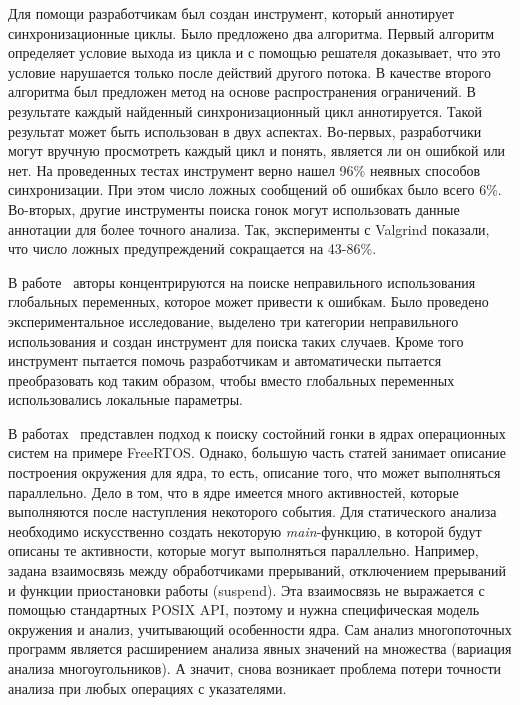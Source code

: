 Для помощи разработчикам был создан инструмент, который аннотирует синхронизационные циклы.
Было предложено два алгоритма.
Первый алгоритм определяет условие выхода из цикла и с помощью решателя доказывает, что это условие нарушается только после действий другого потока.
В качестве второго алгоритма был предложен метод на основе распространения ограничений.
В результате каждый найденный синхронизационный цикл аннотируется. Такой результат может быть использован в двух аспектах.
Во-первых, разработчики могут вручную просмотреть каждый цикл и понять, является ли он ошибкой или нет.
На проведенных тестах инструмент верно нашел 96\% неявных способов синхронизации. При этом число ложных сообщений об ошибках было всего 6\%.
Во-вторых, другие инструменты поиска гонок могут использовать данные аннотации для более точного анализа.
Так, эксперименты с Valgrind показали, что число ложных предупреждений сокращается на 43-86\%. 

В работе~\cite{Smith:2011:LGS} авторы концентрируются на поиске неправильного использования глобальных переменных, которое может привести к ошибкам.
Было проведено экспериментальное исследование, выделено три категории неправильного использования и создан инструмент для поиска таких случаев.
Кроме того инструмент пытается помочь разработчикам и автоматически пытается преобразовать код таким образом, чтобы вместо глобальных переменных использовались локальные параметры.

В работах~\cite{FreeRTOS,RacesFreeRtos} представлен подход к поиску состойний гонки в ядрах операционных систем на примере FreeRTOS. 
Однако, большую часть статей занимает описание построения окружения для ядра, то есть, описание того, что может выполняться параллельно. 
Дело в том, что в ядре имеется много активностей, которые выполняются после наступления некоторого события. 
Для статического анализа необходимо искусственно создать некоторую \textit{main}-функцию, в которой будут описаны те активности, которые могут выполняться параллельно. 
Например, задана взаимосвязь между обработчиками прерываний, отключением прерываний и функции приостановки работы (suspend). 
Эта взаимосвязь не выражается с помощью стандартных POSIX API, поэтому и нужна специфическая модель окружения и анализ, учитывающий особенности ядра. 
Сам анализ многопоточных программ является расширением анализа явных значений на множества (вариация анализа многоугольников).
А значит, снова возникает проблема потери точности анализа при любых операциях с указателями.

